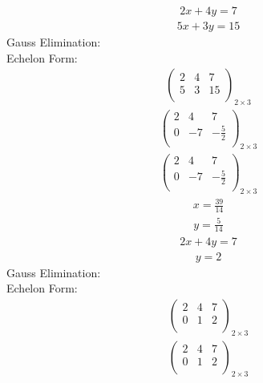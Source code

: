 \documentclass{article}
\begin{document}
\begin{align*}
2x + 4y=7\end{align*}
\begin{align*}
5x + 3y=15\end{align*}
Gauss Elimination:\\
Echelon Form:\\
\begin{align*}
\left(
\begin{array}{cc|c}
2 & 4 & 7\\
5 & 3 & 15\\
\end{array}
\right)_{2\times 3}
\end{align*}
\begin{align*}
\left(
\begin{array}{cc|c}
2 & 4 & 7\\
0 & -7 & -\frac{5}{2}\\
\end{array}
\right)_{2\times 3}
\end{align*}
\begin{align*}
\left(
\begin{array}{cc|c}
2 & 4 & 7\\
0 & -7 & -\frac{5}{2}\\
\end{array}
\right)_{2\times 3}
\end{align*}
\begin{align*}
x=\frac{39}{14}\end{align*}
\begin{align*}
y=\frac{5}{14}\end{align*}
\begin{align*}
2x + 4y=7\end{align*}
\begin{align*}
y=2\end{align*}
Gauss Elimination:\\
Echelon Form:\\
\begin{align*}
\left(
\begin{array}{cc|c}
2 & 4 & 7\\
0 & 1 & 2\\
\end{array}
\right)_{2\times 3}
\end{align*}
\begin{align*}
\left(
\begin{array}{cc|c}
2 & 4 & 7\\
0 & 1 & 2\\
\end{array}
\right)_{2\times 3}
\end{align*}
\end{document}
